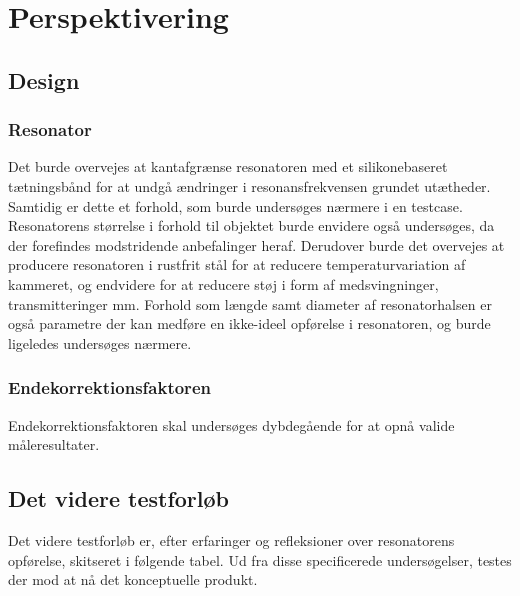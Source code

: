 \chapter{Perspektivering}

\section{Design}
\subsection{Resonator}
Det burde overvejes at kantafgrænse resonatoren med et silikonebaseret tætningsbånd for at undgå ændringer i resonansfrekvensen grundet utætheder. Samtidig er dette et forhold, som burde undersøges nærmere i en testcase. Resonatorens størrelse i forhold til objektet burde envidere også undersøges, da der forefindes modstridende anbefalinger heraf. 
Derudover burde det overvejes at producere resonatoren i rustfrit stål for at reducere temperaturvariation af kammeret, og endvidere for at reducere støj i form af medsvingninger, transmitteringer mm.  
Forhold som længde samt diameter af resonatorhalsen er også parametre der kan medføre en ikke-ideel opførelse i resonatoren, og burde ligeledes undersøges nærmere. 

\subsection{Endekorrektionsfaktoren}
Endekorrektionsfaktoren skal undersøges dybdegående for at opnå valide måleresultater. 

\section{Det videre testforløb}
Det videre testforløb er, efter erfaringer og refleksioner over resonatorens opførelse, skitseret i følgende tabel. Ud fra disse specificerede undersøgelser, testes der mod at nå det konceptuelle produkt.  


